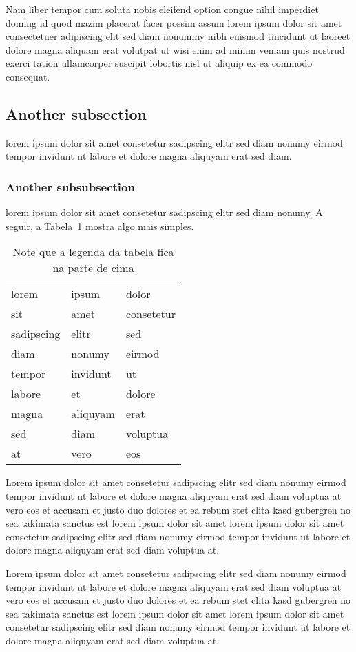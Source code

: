 Nam liber tempor cum soluta nobis eleifend option congue nihil
imperdiet doming id quod mazim placerat facer possim assum lorem
ipsum dolor sit amet consectetuer adipiscing elit sed diam nonummy
nibh euismod tincidunt ut laoreet dolore magna aliquam erat
volutpat ut wisi enim ad minim veniam quis nostrud exerci tation
ullamcorper suscipit lobortis nisl ut aliquip ex ea commodo
consequat.

\subsection{Another subsection}

lorem ipsum dolor sit amet consetetur sadipscing elitr sed diam
nonumy eirmod tempor invidunt ut labore et dolore magna aliquyam
erat sed diam.~\cite{COFFMANPACKING98}

\subsubsection{Another subsubsection}

lorem ipsum dolor sit amet consetetur sadipscing elitr sed diam
nonumy. A seguir, a Tabela~\ref{tab:tab2} mostra algo mais
simples.

\begin{table}
\begin{center}%
\caption{\label{tab:tab2}Note que a legenda da tabela fica na parte de cima}%
\begin{tabular*}{.7\linewidth}{@{\extracolsep{\fill}}lll}%
\noalign{\smallskip}
\hline
lorem & ipsum & dolor \tabularnewline
sit & amet & consetetur \tabularnewline
sadipscing & elitr & sed \tabularnewline
diam & nonumy & eirmod \tabularnewline
tempor & invidunt & ut \tabularnewline
labore & et & dolore \tabularnewline
magna & aliquyam & erat \tabularnewline
sed & diam & voluptua \tabularnewline
at & vero & eos \tabularnewline
\end{tabular*}
\end{center}
\end{table}

Lorem ipsum dolor sit amet consetetur sadipscing elitr sed diam
nonumy eirmod tempor invidunt ut labore et dolore magna aliquyam
erat sed diam voluptua at vero eos et accusam et justo duo dolores
et ea rebum stet clita kasd gubergren no sea takimata sanctus est
lorem ipsum dolor sit amet lorem ipsum dolor sit amet consetetur
sadipscing elitr sed diam nonumy eirmod tempor invidunt ut labore
et dolore magna aliquyam erat sed diam voluptua at.

Lorem ipsum dolor sit amet consetetur sadipscing elitr sed diam
nonumy eirmod tempor invidunt ut labore et dolore magna aliquyam
erat sed diam voluptua at vero eos et accusam et justo duo dolores
et ea rebum stet clita kasd gubergren no sea takimata sanctus est
lorem ipsum dolor sit amet lorem ipsum dolor sit amet consetetur
sadipscing elitr sed diam nonumy eirmod tempor invidunt ut labore
et dolore magna aliquyam erat sed diam voluptua at.
